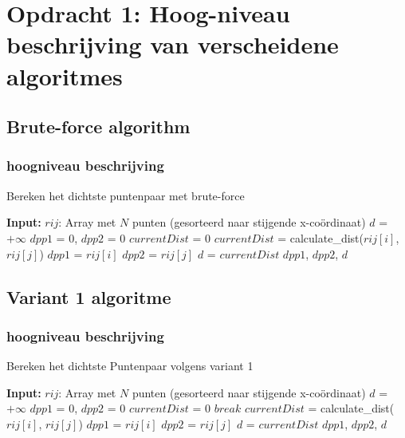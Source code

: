 \documentclass[12pt]{article}
\begin{document}
\section{Opdracht 1: Hoog-niveau beschrijving van verscheidene algoritmes}

\subsection{Brute-force algorithm}

\subsubsection{hoogniveau beschrijving}

\begin{algorithm}
\caption{Bereken het dichtste puntenpaar met brute-force}
\begin{algorithmic}
	\STATE \textbf{Input:}  $rij$: Array met $N$ punten (gesorteerd naar stijgende x-co\"ordinaat)
  \STATE $d$ = $+\infty$
	\STATE $dpp1$ = 0, $dpp2$ = 0
  \STATE $currentDist$ = 0
      \STATE $currentDist$ = calculate\_dist($rij[i]$, $rij[j]$)
				\STATE $dpp1$ = $rij[i]$
				\STATE $dpp2$ = $rij[j]$
        \STATE $d$ = $currentDist$
  		\ENDIF
    \ENDFOR
  \ENDFOR
  \RETURN $dpp1$, $dpp2$, $d$
\end{algorithmic}
\end{algorithm}

\newpage
\subsection{Variant 1 algoritme}
\subsubsection{hoogniveau beschrijving}

\begin{algorithm}
\caption{Bereken het dichtste Puntenpaar volgens variant 1}
\begin{algorithmic}
	\STATE \textbf{Input:}  $rij$: Array met $N$ punten (gesorteerd naar stijgende x-co\"ordinaat)
	\STATE $d$ = $+\infty$
	\STATE $dpp1$ = 0, $dpp2$ = 0
	\STATE $currentDist$ = 0
			\STATE $break$
		\ENDIF
		\STATE $currentDist$ = calculate\_dist($rij[i]$, $rij[j]$)
				\STATE $dpp1$ = $rij[i]$
				\STATE $dpp2$ = $rij[j]$
				\STATE $d$ = $currentDist$
			\ENDIF
		\ENDFOR
	\ENDFOR
	\RETURN $dpp1$, $dpp2$, $d$
\end{algorithmic}
\end{algorithm}
\end{document}
